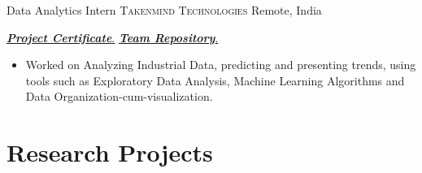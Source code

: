 \documentclass[11pt,a4paper,sans]{moderncv} %
\begin{document}
{Data Analytics Intern}
{\textsc{Takenmind Technologies}}
{Remote, India}
{}
{
    \href{https://github.com/teetangh/Kaustav-All-Certifications/blob/master/Artificial\%20Intelligence/MSP\%20ML\%20Internship/internship\%20certificate.pdf}{ \textbf{\emph{Project Certificate}}.}
    \href{https://github.com/Kaggle-Workspace/UN-SDG-Takenmind-Internship-IBM-Employee-Attrition/blob/main/Major\%20Assignment/Predicition.ipynb}{ \textbf{\emph{Team Repository}}.}
    \begin{itemize}
        \item{Worked on Analyzing Industrial Data, predicting and presenting trends, using tools such as Exploratory Data Analysis, Machine Learning Algorithms and Data Organization-cum-visualization.}
    \end{itemize}
}




\section{Research Projects}
\end{document}
